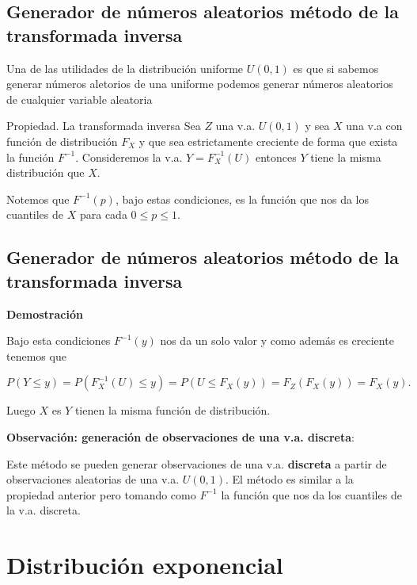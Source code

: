 \documentclass[]{book}
\begin{document}
\hypertarget{generador-de-nuxfameros-aleatorios-muxe9todo-de-la-transformada-inversa}{%
\subsection{Generador de números aleatorios método de la transformada inversa}\label{generador-de-nuxfameros-aleatorios-muxe9todo-de-la-transformada-inversa}}

Una de las utilidades de la distribución uniforme \(U(0,1)\) es que si sabemos generar números aletorios de una uniforme podemos generar números aleatorios de cualquier variable aleatoria

 Propiedad. La transformada inversa
Sea \(Z\) una v.a. \(U(0,1)\) y sea \(X\) una v.a con función de distribución \(F_X\) y que sea estrictamente creciente de forma que exista la función \(F^{-1}\). Consideremos la v.a. \(Y=F_X^{-1}(U)\) entonces \(Y\) tiene la misma distribución que \(X\).

Notemos que \(F^{-1}(p)\), bajo estas condiciones, es la función que nos da los cuantiles de \(X\) para cada \(0\leq p\leq 1\).

\hypertarget{generador-de-nuxfameros-aleatorios-muxe9todo-de-la-transformada-inversa-1}{%
\subsection{Generador de números aleatorios método de la transformada inversa}\label{generador-de-nuxfameros-aleatorios-muxe9todo-de-la-transformada-inversa-1}}

\textbf{Demostración}

Bajo esta condiciones \(F^{-1}(y)\) nos da un solo valor y como además es creciente tenemos que

\[
P(Y\leq y )=P\left(F_X^{-1}(U)\leq y\right)=P(U\leq F_X(y))=F_Z(F_X(y))=F_X(y).
\]

Luego \(X\) es \(Y\) tienen la misma función de distribución.

 \textbf{Observación: generación de observaciones de una v.a. discreta}:

Este método se pueden generar observaciones de una v.a. \textbf{discreta} a partir de observaciones aleatorias de una v.a. \(U(0,1)\). El método es similar a la propiedad anterior pero tomando como \(F^{-1}\) la función que nos da los cuantiles de la v.a. discreta.

\hypertarget{distribuciuxf3n-exponencial}{%
\section{Distribución exponencial}\label{distribuciuxf3n-exponencial}}
\end{document}

